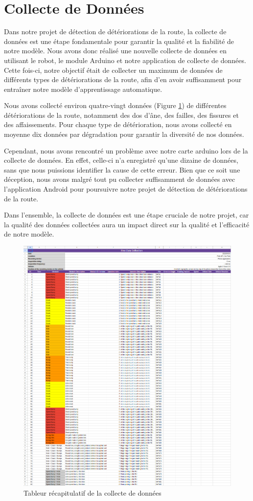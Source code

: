 \section{Collecte de Données}
\label{data_collection}

Dans notre projet de détection de détériorations de la route, la collecte de données est une étape fondamentale pour garantir la qualité et la fiabilité de notre modèle. Nous avons donc réalisé une nouvelle collecte de données en utilisant le robot, le module Arduino et notre application de collecte de données. Cette fois-ci, notre objectif était de collecter un maximum de données de différents types de détériorations de la route, afin d'en avoir suffisamment pour entraîner notre modèle d'apprentissage automatique.

Nous avons collecté environ quatre-vingt données (Figure \ref{data_collection_1}) de différentes détériorations de la route, notamment des dos d'âne, des failles, des fissures et des affaissements. Pour chaque type de détérioration, nous avons collecté en moyenne dix données par dégradation pour garantir la diversité de nos données.

Cependant, nous avons rencontré un problème avec notre carte arduino lors de la collecte de données. En effet, celle-ci n'a enregistré qu'une dizaine de données, sans que nous puissions identifier la cause de cette erreur. Bien que ce soit une déception, nous avons malgré tout pu collecter suffisamment de données avec l'application Android pour poursuivre notre projet de détection de détériorations de la route.

Dans l'ensemble, la collecte de données est une étape cruciale de notre projet, car la qualité des données collectées aura un impact direct sur la qualité et l'efficacité de notre modèle.

\begin{figure}
    \center
    \includegraphics[scale=0.5]{img/data_collection_1.png}
    \caption{Tableur récapitulatif de la collecte de données}
    \label{data_collection_1}
\end{figure}